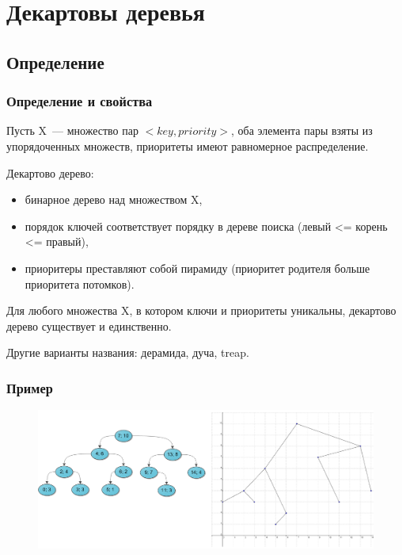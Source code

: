 \documentclass[hyperref={unicode=true}]{beamer}
\begin{document}
\section {Декартовы деревья}
\subsection{Определение}
\frame
{
\frametitle{Определение и свойства}
  Пусть X~--- множество пар $<key, priority>$, оба элемента пары взяты из упорядоченных множеств, приоритеты имеют равномерное распределение.

  Декартово дерево:
  \begin{itemize}
    \item бинарное дерево над множеством X,
    \item порядок ключей соответствует порядку в дереве поиска (левый <= корень <= правый),
    \item приоритеры преставляют собой пирамиду (приоритет родителя больше приоритета потомков).
  \end{itemize}

  
  Для любого множества X, в котором ключи и приоритеты уникальны, декартово дерево существует и единственно.

 
  Другие варианты названия: дерамида, дуча, treap. 
}

\frame
{
  \frametitle{Пример}
  \begin{figure}[h!]
  \centerline{\includegraphics[scale=0.3]{treap.png}}
  \end{figure}
}
\end{document}
